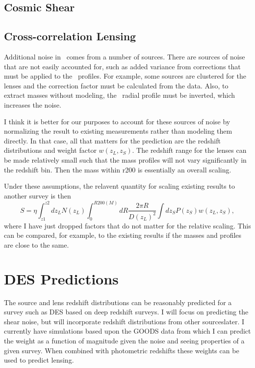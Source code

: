 \documentclass[12pt,preprint]{aastex}
\begin{document}
\subsection{Cosmic Shear}

\subsection{Cross-correlation Lensing}

Additional noise in \deltasig\ comes from a number of sources.  There are
sources of noise that are not easily accounted for, such as added variance from
corrections that must be applied to the \deltasig\ profiles. For example, some
sources are clustered for the lenses and the correction factor must be
calculated from the data.  Also, to extract masses without modeling, the
\deltasig\ radial profile must be inverted, which increases the noise.  

I think it is better for our purposes to account for these sources of noise by
normalizing the result to existing measurements rather than modeling them
directly. In that case, all that matters for the prediction are the redshift
distributions and weight factor $w(z_L, z_S)$.  The redshift range for the
lenses can be made relatively small such that the mass profiles will not vary
significantly in the redshift bin.  Then the mass within r200 is essentially an
overall scaling.

Under these assumptions, the relavent quantity for scaling existing
results to another survey is then
\begin{equation} \label{eq:factor}
S = 
\eta \int_{z1}^{z2} dz_L N(z_L) 
\int_0^{R200(M)} dR \frac{2 \pi R}{D(z_L)^2}
\int dz_S P(z_S) w(z_L, z_S),
\end{equation}
where I have just dropped factors that do not matter for the relative scaling.
This can be compared, for example, to the existing results if the masses and
profiles are close to the same.

\section{DES Predictions}

The source and lens redshift distributions can be reasonably predicted for a
survey such as DES based on deep redshift surveys.  I will focus on predicting
the shear noise, but will incorporate redshift distributions from other
sourceslater. I currently have simulations based upon the GOODS data from which
I can predict the weight as a function of magnitude given the noise and seeing
properties of a given survey.  When combined with photometric redshifts these
weights can be used to predict lensing.
\end{document}
